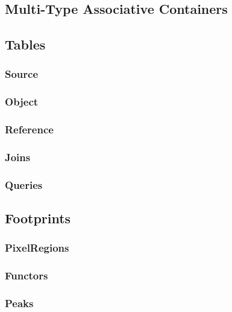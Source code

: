 \subsection{Multi-Type Associative Containers}
\label{sec:spAssociativeContainers}

\subsection{Tables}
\label{sec:spTables}

\subsubsection{Source}
\label{sec:spTablesSource}

\subsubsection{Object}
\label{sec:spTablesObject}

\subsubsection{Reference}
\label{sec:spTablesReference}

\subsubsection{Joins}
\label{sec:spTablesJoins}

\subsubsection{Queries}
\label{sec:spTablesQueries}

\subsection{Footprints}
\label{sec:spFootprints}

\subsubsection{PixelRegions}
\label{sec:spFootprintsPixelRegions}

\subsubsection{Functors}
\label{sec:spFootprintsFunctors}

\subsubsection{Peaks}
\label{sec:spFootprintsPeaks}

